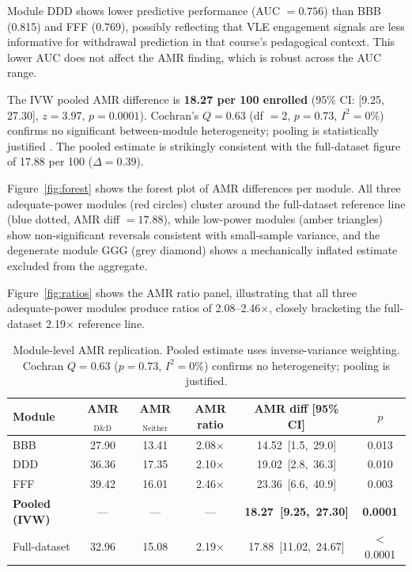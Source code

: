 \documentclass[12pt,a4paper]{article}
\begin{document}
Module DDD shows lower predictive performance (AUC $= 0.756$) than BBB
(0.815) and FFF (0.769), possibly reflecting that VLE engagement signals are
less informative for withdrawal prediction in that course's pedagogical
context. This lower AUC does not affect the AMR finding, which is robust
across the AUC range.

The IVW pooled AMR difference is \textbf{18.27 per 100 enrolled} (95\% CI:
[9.25, 27.30], $z = 3.97$, $p = 0.0001$). Cochran's $Q = 0.63$ (df $= 2$,
$p = 0.73$, $I^2 = 0\%$) confirms no significant between-module
heterogeneity; pooling is statistically justified \citep{cochran1954}. The
pooled estimate is strikingly consistent with the full-dataset figure of 17.88
per 100 ($\Delta = 0.39$).

Figure~\ref{fig:forest} shows the forest plot of AMR differences per module.
All three adequate-power modules (red circles) cluster around the full-dataset
reference line (blue dotted, AMR diff $= 17.88$), while low-power modules
(amber triangles) show non-significant reversals consistent with small-sample
variance, and the degenerate module GGG (grey diamond) shows a mechanically
inflated estimate excluded from the aggregate.

Figure~\ref{fig:ratios} shows the AMR ratio panel, illustrating that all three
adequate-power modules produce ratios of 2.08--2.46$\times$, closely
bracketing the full-dataset 2.19$\times$ reference line.

\begin{table}[ht]
\centering
\caption{Module-level AMR replication. Pooled estimate uses
inverse-variance weighting. Cochran $Q = 0.63$ ($p = 0.73$, $I^2 = 0\%$)
confirms no heterogeneity; pooling is justified.}
\label{tab:module_amr}
\small
\begin{tabular}{lccccc}
\toprule
Module & AMR$_{\text{D\&D}}$ & AMR$_{\text{Neither}}$ & AMR ratio &
AMR diff [95\% CI] & $p$ \\
\midrule
BBB & 27.90 & 13.41 & 2.08$\times$ & 14.52\ [1.5,\ 29.0]  & 0.013 \\
DDD & 36.36 & 17.35 & 2.10$\times$ & 19.02\ [2.8,\ 36.3]  & 0.010 \\
FFF & 39.42 & 16.01 & 2.46$\times$ & 23.36\ [6.6,\ 40.9]  & 0.003 \\
\midrule
\textbf{Pooled (IVW)} & --- & --- & --- &
\textbf{18.27\ [9.25,\ 27.30]} & \textbf{0.0001} \\
\midrule
Full-dataset & 32.96 & 15.08 & 2.19$\times$ & 17.88\ [11.02,\ 24.67] &
$<$0.0001 \\
\bottomrule
\end{tabular}
\end{table}
\end{document}
